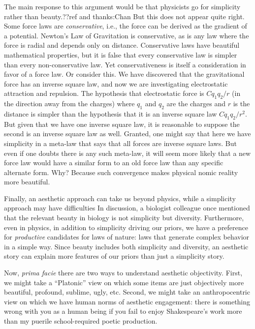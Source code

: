 The main response to this argument would be that physicists go for simplicity rather than beauty.??ref and thanks:Chan 
But this
does not appear quite right. Some force laws are \textit{conservative}, i.e., the force can be derived as 
the gradient of a potential. Newton's Law of Gravitation is conservative, as is any law where the force
is radial and depends only on distance. Conservative laws have beautiful mathematical properties, but it is
false that every conservative law is simpler than every non-conservative law. Yet conservativeness is itself
a consideration in favor of a force law. Or consider this. We have discovered that the gravitational force 
has an inverse square law, and now we are investigating electrostatic attraction and repulsion. The hypothesis
that electrostatic force is $Cq_1q_2/r$ (in the direction away from the charges) where $q_1$ and $q_2$ are the charges and
$r$ is the distance is simpler than the hypothesis that it is an inverse square law $Cq_1q_2/r^2$. But given that 
we have one inverse square law, it is reasonable to suppose the second is an inverse square law as well. Granted,
one might say that here we have simplicity in a meta-law that says that all forces are inverse square laws. But 
even if one doubts there is any such meta-law, it will seem more likely that a new force law would have a similar
form to an old force law than any specific alternate form. Why? Because such convergence makes physical nomic reality 
more beautiful.

Finally, an aesthetic approach can take us beyond physics, while a simplicity approach may have difficulties
In discussion, a biologist colleague once mentioned that the relevant beauty in biology is not simplicity but diversity.
Furthermore, even in physics, in addition to simplicity driving our priors, we have a preference for 
\textit{productive} candidates for laws of nature: laws that generate complex behavior in a simple way.
Since beauty includes both simplicity and diversity, an aesthetic story can explain more features of our
priors than just a simplicity story.

Now, \textit{prima facie} there are two ways to understand aesthetic objectivity. First, we might take a 
``Platonic'' view on which some items are just objectively more beautiful,
profound, sublime, ugly, etc. Second, we might take an anthropocentric view on which we have human 
norms of aesthetic engagement: there is something wrong with you as a human being if you fail to enjoy 
Shakespeare's work more than my puerile school-required poetic production. 

